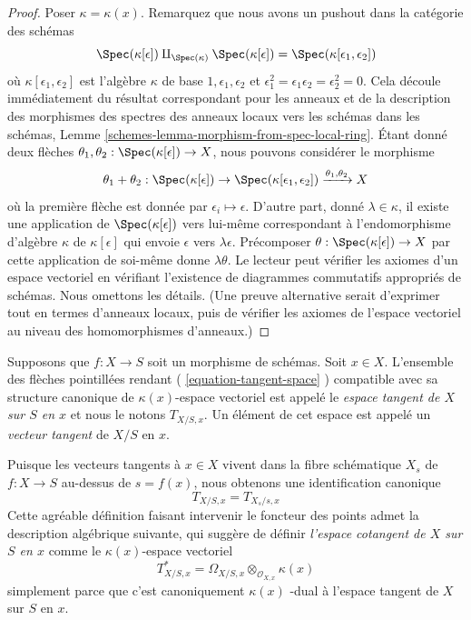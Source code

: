 \begin{proof}
Poser $\kappa = \kappa(x)$. Remarquez que nous
avons un pushout dans la catégorie des schémas
$$
\Spec(\kappa[\epsilon]) \amalg_{\Spec(\kappa)} \Spec(\kappa[\epsilon])
= \Spec(\kappa[\epsilon_1, \epsilon_2])
$$
où $\kappa[\epsilon_1, \epsilon_2]$ est l'algèbre
$\kappa$ de base $1, \epsilon_1, \epsilon_2$ et
$\epsilon_1^2 = \epsilon_1\epsilon_2 =
\epsilon_2^2 = 0$. Cela découle immédiatement du
résultat correspondant pour les anneaux et de la
description des morphismes des spectres des anneaux
locaux vers les schémas dans les schémas, Lemme
\ref{schemes-lemma-morphism-from-spec-local-ring}.
Étant donné deux flèches $\theta_1, \theta_2 :
\Spec(\kappa[\epsilon]) \to X$, nous pouvons considérer le morphisme
$$
\theta_1 + \theta_2 :
\Spec(\kappa[\epsilon]) \to
\Spec(\kappa[\epsilon_1, \epsilon_2])
\xrightarrow{\theta_1, \theta_2} X
$$
où la première flèche est donnée par $\epsilon_i \mapsto \epsilon$.
D'autre part, donné $\lambda \in \kappa$, il existe une application de
$\Spec(\kappa[\epsilon])$ vers lui-même correspondant à l'endomorphisme
d'algèbre $\kappa$ de $\kappa[\epsilon]$ qui envoie $\epsilon$ vers
$\lambda \epsilon$. Précomposer $\theta : \Spec(\kappa[\epsilon]) \to X$ par
cette application de soi-même donne $\lambda \theta$. Le lecteur peut
vérifier les axiomes d'un espace vectoriel en vérifiant l'existence de
diagrammes commutatifs appropriés de schémas. Nous omettons les détails. (Une
preuve alternative serait d'exprimer tout en termes d'anneaux locaux, puis de
vérifier les axiomes de l'espace vectoriel au niveau des homomorphismes d'anneaux.)
\end{proof}

\begin{definition}
\label{definition-tangent-space}
Supposons que $f : X \to S$ soit un morphisme de schémas. Soit $x \in X$.
L'ensemble des flèches pointillées rendant ( \ref{equation-tangent-space} )
compatible avec sa structure canonique de $\kappa(x)$-espace vectoriel est
appelé le {\it espace tangent de $X$ sur $S$ en $x$ } et nous le notons $T_{X/S,
x}$. Un élément de cet espace est appelé un {\it vecteur tangent } de $X/S$ en $x$.
\end{definition}

\noindent
Puisque les vecteurs tangents à $x \in X$ vivent dans la fibre schématique $X_s$ de
$f : X \to S$ au-dessus de $s = f(x)$, nous obtenons une identification canonique
\begin{equation}
\label{equation-tangent-space-fibre}
T_{X/S, x} = T_{X_s/s, x}
\end{equation}
Cette agréable définition faisant intervenir le
foncteur des points admet la description algébrique
suivante, qui suggère de définir {\it l'espace cotangent de
$X$ sur $S$ en $x$ } comme le $\kappa(x)$-espace vectoriel
$$
T^*_{X/S, x} = \Omega_{X/S, x} \otimes_{\mathcal{O}_{X, x}} \kappa(x)
$$
simplement parce que c'est canoniquement
$\kappa(x)$ -dual à l'espace tangent de $X$ sur $S$ en $x$.

